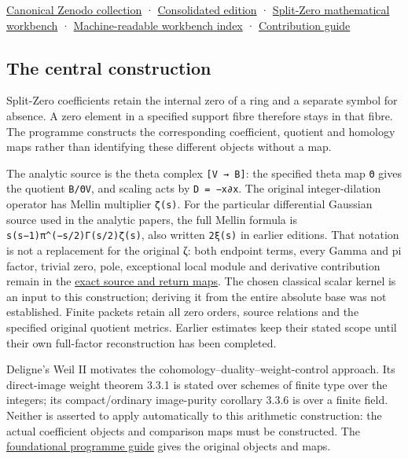 \documentclass[
]{article}
\begin{document}
\href{https://doi.org/10.5281/zenodo.22678085}{Canonical Zenodo collection} ·
\href{https://zenodo.org/records/22950644}{Consolidated edition} ·
\href{https://github.com/KokunoYumeto/zeta-function-research-reader/blob/main/workbenches/splitzero-tandem/README.md}{Split-Zero
mathematical workbench} ·
\href{https://github.com/KokunoYumeto/zeta-function-research-reader/blob/main/WORKBENCHES.json}{Machine-readable
workbench index} ·
\href{https://github.com/KokunoYumeto/zeta-function-research-reader/blob/main/POLYCLANK_PARTICIPATION.md}{Contribution
guide}

\subsection{The central construction}\label{the-central-construction}

Split-Zero coefficients retain the internal zero of a ring and a
separate symbol for absence. A zero element in a specified support fibre
therefore stays in that fibre. The programme constructs the
corresponding coefficient, quotient and homology maps rather than
identifying these different objects without a map.

The analytic source is the theta complex \texttt{{[}V\ →\ B{]}}: the
specified theta map \texttt{Θ} gives the quotient \texttt{B/ΘV}, and
scaling acts by \texttt{D\ =\ −x∂x}. The original integer-dilation
operator has Mellin multiplier \texttt{ζ(s)}. For the particular
differential Gaussian source used in the analytic papers, the full
Mellin formula is \texttt{s(s−1)π\^{}(−s/2)Γ(s/2)ζ(s)}, also written
\texttt{2ξ(s)} in earlier editions. That notation is not a replacement
for the original ζ: both endpoint terms, every Gamma and pi factor,
trivial zero, pole, exceptional local module and derivative contribution
remain in the
\href{https://github.com/KokunoYumeto/zeta-function-research-reader/blob/acd7016b8232a56f31ae3e69fb800571e8789080/workbenches/splitzero-tandem/continuations/20260923-retained-source-readers/original-zeta-full-boundary/independent/ORIGINAL_ZETA_THETA_CORRECTION.tex}{exact
source and return maps}. The chosen classical scalar kernel is an input
to this construction; deriving it from the entire absolute base was not
established. Finite packets retain all zero orders, source relations and
the specified original quotient metrics. Earlier estimates keep their
stated scope until their own full-factor reconstruction has been
completed.

Deligne's Weil II motivates the cohomology--duality--weight-control
approach. Its direct-image weight theorem 3.3.1 is stated over schemes
of finite type over the integers; its compact/ordinary image-purity
corollary 3.3.6 is over a finite field. Neither is asserted to apply
automatically to this arithmetic construction: the actual coefficient
objects and comparison maps must be constructed. The
\href{https://github.com/KokunoYumeto/zeta-function-research-reader/blob/main/RESEARCH_PROGRAMMES.md}{foundational
programme guide} gives the original objects and maps.
\end{document}
